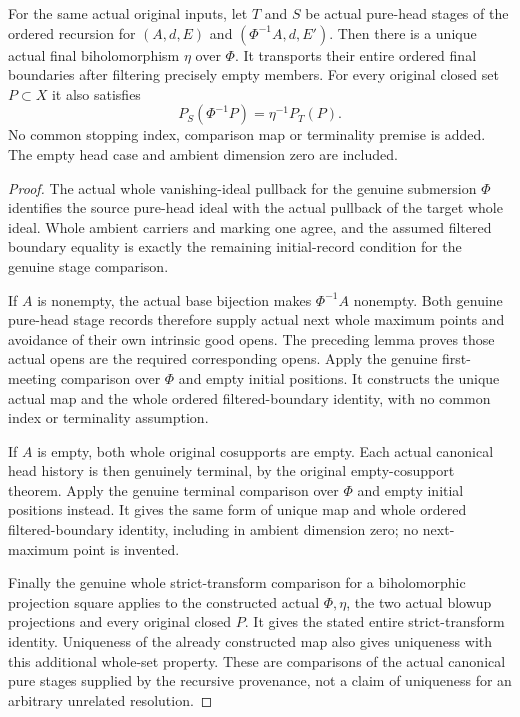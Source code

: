 \begin{theorem}
\label{hir:original-pure-head-unique-empty-base-comparison}
\leanok
For the same actual original inputs, let $T$ and $S$ be actual pure-head
stages of the ordered recursion for $(A,d,E)$ and
$(\Phi^{-1}A,d,E')$. Then there is a unique actual final biholomorphism
$\eta$ over $\Phi$. It transports their entire ordered final boundaries
after filtering precisely empty members. For every original closed set
$P\subset X$ it also satisfies
\[
 P_S(\Phi^{-1}P)=\eta^{-1}P_T(P).
\]
No common stopping index, comparison map or terminality premise is added.
The empty head case and ambient dimension zero are included.
\end{theorem}
\begin{proof}
The actual whole vanishing-ideal pullback for the genuine submersion
$\Phi$ identifies the source pure-head ideal with the actual pullback
of the target whole ideal. Whole ambient carriers and marking one
agree, and the assumed filtered boundary equality is exactly the
remaining initial-record condition for the genuine stage comparison.

If $A$ is nonempty, the actual base bijection makes $\Phi^{-1}A$
nonempty. Both genuine pure-head stage records therefore supply actual
next whole maximum points and avoidance of their own intrinsic good
opens. The preceding lemma proves those actual opens are the required
corresponding opens. Apply the genuine first-meeting comparison over
$\Phi$ and empty initial positions. It constructs the unique actual
map and the whole ordered filtered-boundary identity, with no common
index or terminality assumption.

If $A$ is empty, both whole original cosupports are empty. Each actual
canonical head history is then genuinely terminal, by the original
empty-cosupport theorem. Apply the genuine terminal comparison over
$\Phi$ and empty initial positions instead. It gives the same form of
unique map and whole ordered filtered-boundary identity, including in
ambient dimension zero; no next-maximum point is invented.

Finally the genuine whole strict-transform comparison for a
biholomorphic projection square applies to the constructed actual
$\Phi,\eta$, the two actual blowup projections and every original
closed $P$. It gives the stated entire strict-transform identity.
Uniqueness of the already constructed map also gives uniqueness with
this additional whole-set property. These are comparisons of the actual
canonical pure stages supplied by the recursive provenance, not a
claim of uniqueness for an arbitrary unrelated resolution.
\end{proof}
